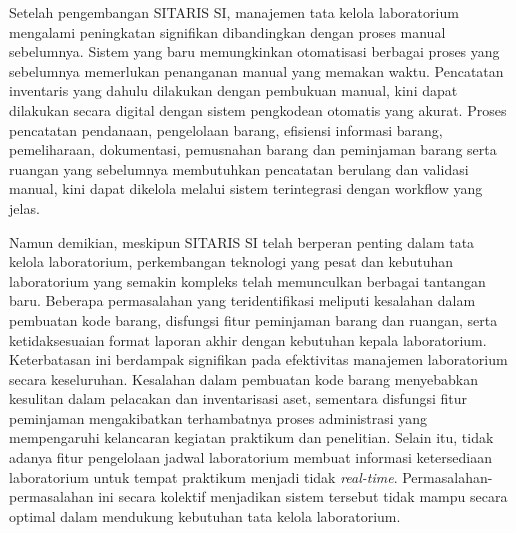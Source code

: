 Setelah pengembangan SITARIS SI, manajemen tata kelola laboratorium mengalami peningkatan signifikan dibandingkan dengan proses manual sebelumnya. Sistem yang baru memungkinkan otomatisasi berbagai proses yang sebelumnya memerlukan penanganan manual yang memakan waktu. Pencatatan inventaris yang dahulu dilakukan dengan pembukuan manual, kini dapat dilakukan secara digital dengan sistem pengkodean otomatis yang akurat. Proses pencatatan pendanaan, pengelolaan barang, efisiensi informasi barang, pemeliharaan, dokumentasi, pemusnahan barang dan peminjaman barang serta ruangan yang sebelumnya membutuhkan pencatatan berulang dan validasi manual, kini dapat dikelola melalui sistem terintegrasi dengan workflow yang jelas.

Namun demikian, meskipun SITARIS SI telah berperan penting dalam tata kelola laboratorium, perkembangan teknologi yang pesat dan kebutuhan laboratorium yang semakin kompleks telah memunculkan berbagai tantangan baru. Beberapa permasalahan yang teridentifikasi meliputi kesalahan dalam pembuatan kode barang, disfungsi fitur peminjaman barang dan ruangan, serta ketidaksesuaian format laporan akhir dengan kebutuhan kepala laboratorium. Keterbatasan ini berdampak signifikan pada efektivitas manajemen laboratorium secara keseluruhan. Kesalahan dalam pembuatan kode barang menyebabkan kesulitan dalam pelacakan dan inventarisasi aset, sementara disfungsi fitur peminjaman mengakibatkan terhambatnya proses administrasi yang mempengaruhi kelancaran kegiatan praktikum dan penelitian. Selain itu, tidak adanya fitur pengelolaan jadwal laboratorium membuat informasi ketersediaan laboratorium untuk tempat praktikum menjadi tidak \textit{real-time}. Permasalahan-permasalahan ini secara kolektif menjadikan sistem tersebut tidak mampu secara optimal dalam mendukung kebutuhan tata kelola laboratorium.

